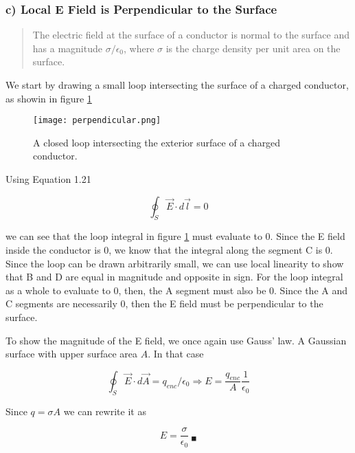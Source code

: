 \subsubsection*{c) Local E Field is Perpendicular to the Surface}

\begin{quote}
The electric field at the surface of a conductor is normal to the
surface and has a magnitude $\sigma / \epsilon_0$, where $\sigma$ is
the charge density per unit area on the surface.
\end{quote}

We start by drawing a small loop intersecting the surface of a charged
conductor, as showin in figure \ref{fig:1:1:loopy}

\begin{figure}
  \centering
  \texttt{[image: perpendicular.png]}
  \caption{A closed loop intersecting the exterior surface of a
    charged conductor.}
\label{fig:1:1:loopy}
\end{figure}

Using Equation 1.21

\begin{equation}
  \oint_S \vec{E} \cdot d\vec{l} = 0
\end{equation}

we can see that the loop integral in figure \ref{fig:1:1:loopy} must
evaluate to 0.  Since the E field inside the conductor is 0, we know
that the integral along the segment C is 0.  Since the loop can be
drawn arbitrarily small, we can use local linearity to show that B and
D are equal in magnitude and opposite in sign.  For the loop integral
as a whole to evaluate to 0, then, the A segment must also be 0.
Since the A and C segments are necessarily 0, then the E field must be
perpendicular to the surface.

To show the magnitude of the E field, we once again use Gauss' law.  A
Gaussian surface with upper surface area $A$.  In that case

\begin{equation}
  \oint_S{\vec{E} \cdot d\vec{A} = q_{enc} / \epsilon_0}
  \Rightarrow E = \frac{q_{enc}}{A} \frac{1}{\epsilon_0}
\end{equation}

Since $q = \sigma A$ we can rewrite it as

\begin{equation}
  E = \frac{\sigma}{\epsilon_0}
  \ _\blacksquare
\end{equation}
